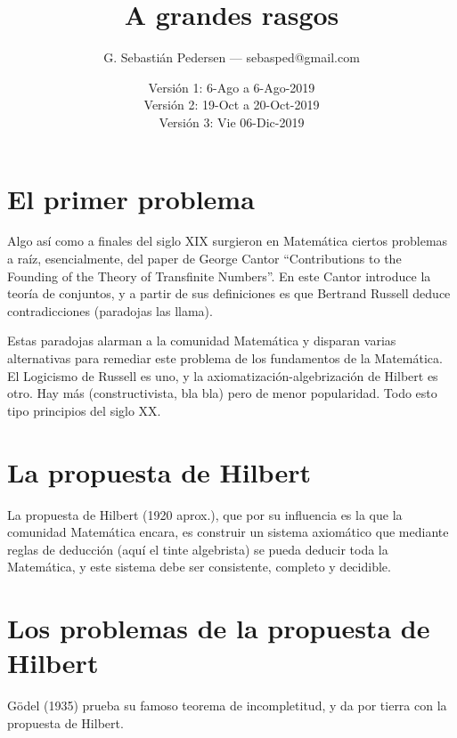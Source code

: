 \documentclass[a4paper,11pt]{article}
\title{A grandes rasgos}
\author{G. Sebastián Pedersen --- sebasped@gmail.com}
\date{Versión 1: 6-Ago a 6-Ago-2019\\
Versión 2: 19-Oct a 20-Oct-2019\\
Versión 3: Vie 06-Dic-2019}
\begin{document}
\maketitle


\tableofcontents
\section{El primer problema}
Algo así como a finales del siglo XIX surgieron en Matemática ciertos problemas a raíz, esencialmente, del paper de George Cantor ``Contributions to the Founding of the Theory of Transfinite Numbers''. En este Cantor introduce la teoría de conjuntos, y a partir de sus definiciones es que Bertrand Russell deduce contradicciones (paradojas las llama).

Estas paradojas alarman a la comunidad Matemática y disparan varias alternativas para remediar este problema de los fundamentos de la Matemática. El Logicismo de Russell es uno, y la axiomatización-algebrización de Hilbert es otro. Hay más (constructivista, bla bla) pero de menor popularidad. Todo esto tipo principios del siglo XX.

\section{La propuesta de Hilbert}
La propuesta de Hilbert (1920 aprox.), que por su influencia es la que la comunidad Matemática encara, es construir un sistema axiomático que mediante reglas de deducción (aquí el tinte algebrista) se pueda deducir toda la Matemática, y este sistema debe ser consistente, completo y decidible.

\section{Los problemas de la propuesta de Hilbert}
Gödel (1935) prueba su famoso teorema de incompletitud, y da por tierra con la propuesta de Hilbert.
\end{document}

